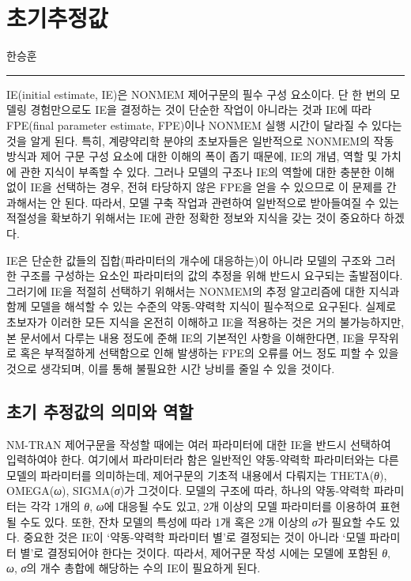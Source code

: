 \documentclass[
  10pt,
  krantz2,
  a4paper]{krantz}
\theoremstyle{definition}
\theoremstyle{definition}
\theoremstyle{definition}
\theoremstyle{remark}
\begin{document}
\hypertarget{IE}{%
\chapter{초기추정값}\label{IE}}

한승훈

\begin{center}\rule{0.5\linewidth}{0.5pt}\end{center}

IE(initial estimate, IE)은 NONMEM 제어구문의 필수 구성 요소이다. 단 한 번의 모델링 경험만으로도 IE을 결정하는 것이 단순한 작업이 아니라는 것과 IE에 따라 FPE(final parameter estimate, FPE)이나 NONMEM 실행 시간이 달라질 수 있다는 것을 알게 된다. 특히, 계량약리학 분야의 초보자들은 일반적으로 NONMEM의 작동 방식과 제어 구문 구성 요소에 대한 이해의 폭이 좁기 때문에, IE의 개념, 역할 및 가치에 관한 지식이 부족할 수 있다. 그러나 모델의 구조나 IE의 역할에 대한 충분한 이해 없이 IE을 선택하는 경우, 전혀 타당하지 않은 FPE을 얻을 수 있으므로 이 문제를 간과해서는 안 된다. 따라서, 모델 구축 작업과 관련하여 일반적으로 받아들여질 수 있는 적절성을 확보하기 위해서는 IE에 관한 정확한 정보와 지식을 갖는 것이 중요하다 하겠다.

IE은 단순한 값들의 집합(파라미터의 개수에 대응하는)이 아니라 모델의 구조와 그러한 구조를 구성하는 요소인 파라미터의 값의 추정을 위해 반드시 요구되는 출발점이다. 그러기에 IE을 적절히 선택하기 위해서는 NONMEM의 추정 알고리즘에 대한 지식과 함께 모델을 해석할 수 있는 수준의 약동-약력학 지식이 필수적으로 요구된다. 실제로 초보자가 이러한 모든 지식을 온전히 이해하고 IE을 적용하는 것은 거의 불가능하지만, 본 문서에서 다루는 내용 정도에 준해 IE의 기본적인 사항을 이해한다면, IE을 무작위로 혹은 부적절하게 선택함으로 인해 발생하는 FPE의 오류를 어느 정도 피할 수 있을 것으로 생각되며, 이를 통해 불필요한 시간 낭비를 줄일 수 있을 것이다.

\hypertarget{IE-role}{%
\section{초기 추정값의 의미와 역할}\label{IE-role}}

NM-TRAN 제어구문을 작성할 때에는 여러 파라미터에 대한 IE을 반드시 선택하여 입력하여야 한다. 여기에서 파라미터라 함은 일반적인 약동-약력학 파라미터와는 다른 모델의 파라미터를 의미하는데, 제어구문의 기초적 내용에서 다뤄지는 THETA(\emph{θ}), OMEGA(\emph{ω}), SIGMA(\emph{σ})가 그것이다. 모델의 구조에 따라, 하나의 약동-약력학 파라미터는 각각 1개의 \emph{θ}, \emph{ω}에 대응될 수도 있고, 2개 이상의 모델 파라미터를 이용하여 표현될 수도 있다. 또한, 잔차 모델의 특성에 따라 1개 혹은 2개 이상의 \emph{σ}가 필요할 수도 있다. 중요한 것은 IE이 `약동-약력학 파라미터 별'로 결정되는 것이 아니라 `모델 파라미터 별'로 결정되어야 한다는 것이다. 따라서, 제어구문 작성 시에는 모델에 포함된 \emph{θ}, \emph{ω}, \emph{σ}의 개수 총합에 해당하는 수의 IE이 필요하게 된다.
\end{document}
